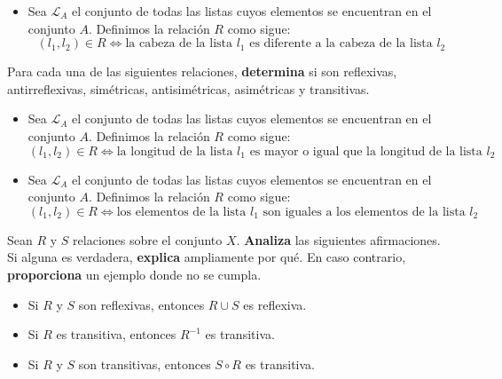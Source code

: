 \documentclass[oneside]{style}
\begin{document}
\begin{questions}[label=\protect\circled{\bfseries\arabic*}]
{\begin{itemize}
            \item Sea $\mathcal{L}_{A}$ el conjunto de todas las listas cuyos
            elementos se encuentran en el conjunto $A$. Definimos la relación 
            $R$ como sigue: 
            \begin{equation*}
                (l_1, l_2) \in R \Leftrightarrow \text{la cabeza de la lista } 
                l_1 \text{ es diferente a la cabeza de la lista } l_2
            \end{equation*} 
        \end{itemize}
    }

    \question
    {
        Para cada una de las siguientes relaciones, \textbf{determina} si son 
        reflexivas, antirreflexivas, simétricas, antisimétricas, asimétricas y 
        transitivas. 
        \begin{itemize}
            \item Sea $\mathcal{L}_{A}$ el conjunto de todas las listas cuyos
            elementos se encuentran en el conjunto $A$. Definimos la relación 
            $R$ como sigue: 
            \begin{equation*}
                (l_1, l_2) \in R \Leftrightarrow \text{la longitud de la lista } 
                l_1 \text{ es mayor o igual que la longitud de la lista } l_2
            \end{equation*} 

            \item Sea $\mathcal{L}_{A}$ el conjunto de todas las listas cuyos
            elementos se encuentran en el conjunto $A$. Definimos la relación 
            $R$ como sigue: 
            \begin{equation*}
                (l_1, l_2) \in R \Leftrightarrow \text{los elementos de la 
                lista } l_1 \text{ son iguales a los elementos de la lista } l_2
            \end{equation*} 
        \end{itemize}
    }

    \newpage
    \question
    {
        Sean $R$ y $S$ relaciones sobre el conjunto $X$. \textbf{Analiza} las 
        siguientes afirmaciones. Si alguna es verdadera, \textbf{explica} 
        ampliamente por qué. En caso contrario, \textbf{proporciona} un ejemplo 
        donde no se cumpla. 
        \begin{itemize}
            \item Si $R$ y $S$ son reflexivas, entonces $R \cup S$ es reflexiva.
            \item Si $R$ es transitiva, entonces $R^{-1}$ es transitiva.
            \item Si $R$ y $S$ son transitivas, entonces $S \circ R$ es 
            transitiva. 
        \end{itemize}
    }


\end{questions}
\end{document}
